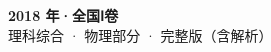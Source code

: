 \documentclass[zihao=-4, a4paper]{ctexart}
\begin{document}
\begin{center}
  {\Large\bfseries 2018 年·全国Ⅰ卷}\\[4pt]
  {\large 理科综合 · 物理部分 · 完整版（含解析）}
\end{center}
\medskip
{}

\clearpage
{}

\clearpage
{}

\end{document}
